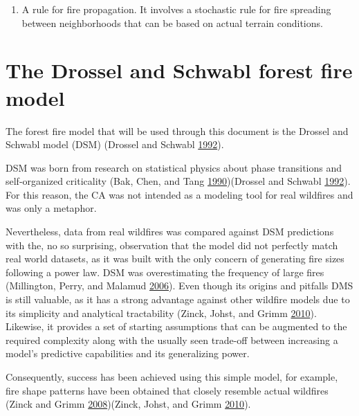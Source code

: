 \documentclass[
  12pt,
  openany]{book}
\providecommand{\tightlist}{%
  \setlength{\itemsep}{0pt}\setlength{\parskip}{0pt}}
\begin{document}
\begin{enumerate}
\def\labelenumi{\arabic{enumi}.}
\setcounter{enumi}{2}
\tightlist
\item
  A rule for fire propagation. It involves a stochastic rule for fire spreading between neighborhoods that can be based on actual terrain conditions.
\end{enumerate}

\hypertarget{the-drossel-and-schwabl-forest-fire-model}{%
\section{The Drossel and Schwabl forest fire model}\label{the-drossel-and-schwabl-forest-fire-model}}

The forest fire model that will be used through this document is the Drossel and Schwabl model (DSM) (Drossel and Schwabl \protect\hyperlink{ref-drossel1992self}{1992}).

DSM was born from research on statistical physics about phase transitions and self-organized criticality (Bak, Chen, and Tang \protect\hyperlink{ref-bak1990forest}{1990})(Drossel and Schwabl \protect\hyperlink{ref-drossel1992self}{1992}). For this reason, the CA was not intended as a modeling tool for real wildfires and was only a metaphor.

Nevertheless, data from real wildfires was compared against DSM predictions with the, no so surprising, observation that the model did not perfectly match real world datasets, as it was built with the only concern of generating fire sizes following a power law. DSM was overestimating the frequency of large fires (Millington, Perry, and Malamud \protect\hyperlink{ref-millington2006models}{2006}). Even though its origins and pitfalls DMS is still valuable, as it has a strong advantage against other wildfire models due to its simplicity and analytical tractability (Zinck, Johst, and Grimm \protect\hyperlink{ref-zinck2010wildfire}{2010}). Likewise, it provides a set of starting assumptions that can be augmented to the required complexity along with the usually seen trade-off between increasing a model's predictive capabilities and its generalizing power.

Consequently, success has been achieved using this simple model, for example, fire shape patterns have been obtained that closely resemble actual wildfires (Zinck and Grimm \protect\hyperlink{ref-zinck2008more}{2008})(Zinck, Johst, and Grimm \protect\hyperlink{ref-zinck2010wildfire}{2010}).
\end{document}
